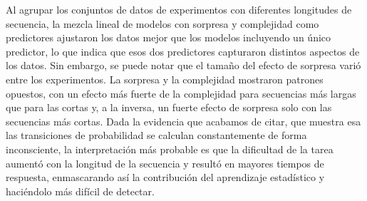Al agrupar los conjuntos de datos de experimentos con diferentes longitudes de secuencia, la mezcla lineal de modelos con sorpresa y complejidad como predictores ajustaron los datos mejor que los modelos incluyendo un único predictor, lo que indica que esos dos predictores capturaron distintos aspectos de los datos. Sin embargo, se puede notar que el tamaño del efecto de sorpresa varió entre los experimentos. La sorpresa y la complejidad mostraron patrones opuestos, con un efecto más fuerte de la complejidad para secuencias más largas que para las cortas y, a la inversa, un fuerte efecto de sorpresa solo con las secuencias más cortas. Dada la evidencia que acabamos de citar, que muestra esa las transiciones de probabilidad se calculan constantemente de forma inconsciente, la interpretación más probable es que la dificultad de la tarea aumentó con la longitud de la secuencia y resultó en mayores tiempos de respuesta, enmascarando así la contribución del aprendizaje estadístico y haciéndolo más difícil de detectar. 

